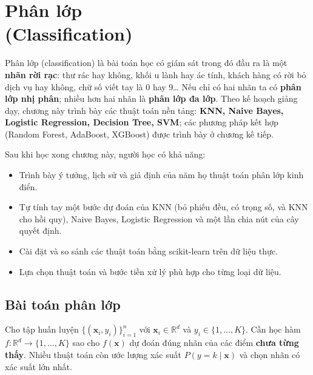 
\chapter{Phân lớp \\ (Classification)}
\label{chap:classify}

Phân lớp (classification) là bài toán học có giám sát trong đó đầu ra là một \textbf{nhãn rời rạc}: thư rác hay không, khối u lành hay ác tính, khách hàng có rời bỏ dịch vụ hay không, chữ số viết tay là 0 hay 9\ldots{} Nếu chỉ có hai nhãn ta có \textbf{phân lớp nhị phân}; nhiều hơn hai nhãn là \textbf{phân lớp đa lớp}. Theo kế hoạch giảng dạy, chương này trình bày các thuật toán nền tảng: \textbf{KNN, Naive Bayes, Logistic Regression, Decision Tree, SVM}; các phương pháp kết hợp (Random Forest, AdaBoost, XGBoost) được trình bày ở chương kế tiếp.

\noindent Sau khi học xong chương này, người học có khả năng:
\begin{itemize}
    \item Trình bày ý tưởng, lịch sử và giả định của năm họ thuật toán phân lớp kinh điển.
    \item Tự tính tay một bước dự đoán của KNN (bỏ phiếu đều, có trọng số, và KNN cho hồi quy), Naive Bayes, Logistic Regression và một lần chia nút của cây quyết định.
    \item Cài đặt và so sánh các thuật toán bằng scikit-learn trên dữ liệu thực.
    \item Lựa chọn thuật toán và bước tiền xử lý phù hợp cho từng loại dữ liệu.
\end{itemize}

\section{Bài toán phân lớp}

\begin{definition}
Cho tập huấn luyện $\{(\mathbf{x}_i, y_i)\}_{i=1}^{n}$ với $\mathbf{x}_i \in \mathbb{R}^d$ và $y_i \in \{1, \dots, K\}$. Cần học hàm $f: \mathbb{R}^d \to \{1, \dots, K\}$ sao cho $f(\mathbf{x})$ dự đoán đúng nhãn của các điểm \textbf{chưa từng thấy}. Nhiều thuật toán còn ước lượng xác suất $P(y = k \mid \mathbf{x})$ và chọn nhãn có xác suất lớn nhất.
\end{definition}

